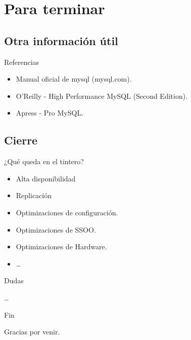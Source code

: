 \section*{Para terminar}
\subsection*{Otra información útil}
\begin{frame}{Referencias}
  \begin{itemize}
    \item Manual oficial de mysql (mysql.com).
    \item O'Reilly - High Performance MySQL (Second Edition).
    \item Apress - Pro MySQL.
  \end{itemize}
\end{frame}

\subsection*{Cierre}

\begin{frame}{¿Qué queda en el tintero?}
  \begin{itemize}
    \item Alta disponibilidad
    \item Replicación
    \item Optimizaciones de configuración.
    \item Optimizaciones de SSOO.
    \item Optimizaciones de Hardware.
    \item \dots
  \end{itemize}
\end{frame}

\begin{frame}{Dudas}
  \begin{center}
    \dots
  \end{center}
\end{frame}

\begin{frame}{Fin}
  \begin{center}
    Gracias por venir.
  \end{center}
\end{frame}
